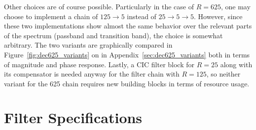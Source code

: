 \begin{table}
    \centering
    \caption[Downsampling Ratio Decompositions and Factors for Filter Stages]{
        The downsampling ratios, their prime factor decompositions, and the
        filtering stages with their downsampling ratios%
    }
    \label{tab:ratio_decompositions}
\end{table}

Other choices  are of  course possible. Particularly in  the case  of $R=625$,
one  may  choose to  implement  a  chain of  $125  \rightarrow  5$ instead  of
$25  \rightarrow 5  \rightarrow 5$. However,  since these  two implementations
show  almost  the same  behavior  over  the  relevant  parts of  the  spectrum
(passband  and transition  band), the  choice is  somewhat arbitrary. The  two
variants  are  graphically  compared  in  Figure~\ref{fig:dec625_variants}  on
\pageref{fig:dec625_variants}  in  Appendix~\ref{sec:dec625_variants} both  in
terms of magnitude and phase response.   Lastly, a CIC filter block for $R=25$
along with its compensator is needed anyway for the filter chain with $R=125$,
so neither  variant for the  \num{625} chain  requires new building  blocks in
terms of resource usage.

\section{Filter Specifications} %
\label{sec:fdesign:filter_specifications}

